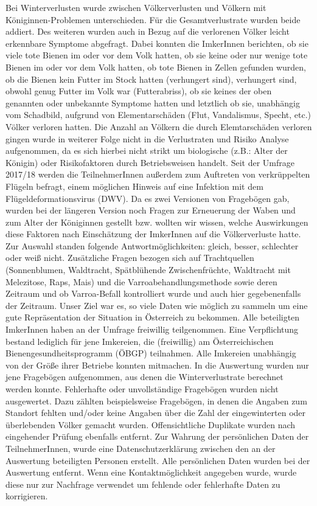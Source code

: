 \newline
Bei Winterverlusten wurde zwischen Völkerverlusten und Völkern mit Königinnen-Problemen unterschieden. Für die Gesamtverlustrate wurden beide addiert. Des weiteren wurden auch in Bezug auf die verlorenen Völker leicht erkennbare Symptome abgefragt. Dabei konnten die ImkerInnen berichten, ob sie viele tote Bienen im oder vor dem Volk hatten, ob sie keine oder nur wenige tote Bienen im oder vor dem Volk hatten, ob tote Bienen in Zellen gefunden wurden, ob die Bienen kein Futter im Stock hatten (verhungert sind), verhungert sind, obwohl genug Futter im Volk war (Futterabriss), ob sie keines der oben genannten oder unbekannte Symptome hatten und letztlich ob sie, unabhängig vom Schadbild, aufgrund von Elementarschäden (Flut, Vandalismus, Specht, etc.) Völker verloren hatten. Die Anzahl an Völkern die durch Elemtarschäden verloren gingen wurde in weiterer Folge nicht in die Verlustraten und Risiko Analyse aufgenommen, da es sich hierbei nicht strikt um biologische (z.B.: Alter der Königin) oder Risikofaktoren durch Betriebsweisen handelt. Seit der Umfrage 2017/18 werden die TeilnehmerInnen außerdem zum Auftreten von verkrüppelten Flügeln befragt, einem möglichen Hinweis auf eine Infektion mit dem Flügeldeformationsvirus (DWV).
\newline
Da es zwei Versionen von Fragebögen gab, wurden bei der längeren Version noch Fragen zur Erneuerung der Waben und zum Alter der Königinnen gestellt bzw. wollten wir wissen, welche Auswirkungen diese Faktoren nach Einschätzung der ImkerInnen auf die Völkerverluste hatte. Zur Auswahl standen folgende Antwortmöglichkeiten: gleich, besser, schlechter oder weiß nicht. Zusätzliche Fragen bezogen sich auf Trachtquellen (Sonnenblumen, Waldtracht, Spätblühende Zwischenfrüchte, Waldtracht mit Melezitose, Raps, Mais) und die Varroabehandlungsmethode sowie deren Zeitraum und ob Varroa-Befall kontrolliert wurde und auch hier gegebenenfalls der Zeitraum. 
\newline
Unser Ziel war es, so viele Daten wie möglich zu sammeln um eine gute Repräsentation der Situation in Österreich zu bekommen. Alle beteiligten ImkerInnen haben an der Umfrage freiwillig teilgenommen. Eine Verpflichtung bestand lediglich für jene Imkereien, die (freiwillig) am Österreichischen Bienengesundheitsprogramm (ÖBGP) teilnahmen. Alle Imkereien unabhängig von der Größe ihrer Betriebe konnten mitmachen. In die Auswertung wurden nur jene Fragebögen aufgenommen, aus denen die Winterverlustrate berechnet werden konnte. Fehlerhafte oder unvollständige Fragebögen wurden nicht ausgewertet. Dazu zählten beispielsweise Fragebögen, in denen die Angaben zum Standort fehlten und/oder keine Angaben über die Zahl der eingewinterten oder überlebenden Völker gemacht wurden.  Offensichtliche Duplikate wurden nach eingehender Prüfung ebenfalls entfernt.
\newline
Zur Wahrung der persönlichen Daten der TeilnehmerInnen, wurde eine Datenschutzerklärung zwischen den an der Auswertung beteiligten Personen erstellt. Alle persönlichen Daten wurden bei der Auswertung entfernt. Wenn eine Kontaktmöglichkeit angegeben wurde, wurde diese nur zur Nachfrage verwendet um fehlende oder fehlerhafte Daten zu korrigieren.

